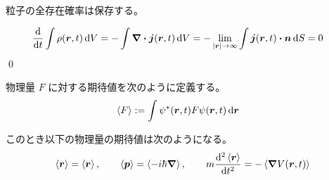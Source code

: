 \documentclass[uplatex,dvipdfmx,a4paper,11pt]{jlreq}
\makeatletter
\newcommand{\rr}{\bm{r}}
\newcommand{\pp}{\bm{p}}
\theoremstyle{definition}
\renewenvironment{proof}[1][\proofname]{\par
  \normalfont
  \topsep6\p@\@plus6\p@ \trivlist
  \item[\hskip\labelsep{\bfseries #1}\@addpunct{\bfseries}]\ignorespaces\quad\par
}{%
  \qed\endtrivlist\@endpefalse
}
\renewcommand\proofname{証明}
\makeatother
\begin{document}
\begin{theorem}
  粒子の全存在確率は保存する。
\end{theorem}
\begin{proof}
  \begin{align}
    \dv{t}\int\rho(\rr, t)\dd{V} & = -\int\vnabla\vdot\bm{j}(\rr, t)\dd{V} = -\lim_{|\rr|\to\infty}\int\bm{j}(\rr, t)\vdot\bm{n}\dd{S} = 0
  \end{align}
\end{proof}
\begin{definition}
  物理量 $F$ に対する期待値を次のように定義する。
  \begin{align}
    \ev{F} & := \int\psi^*(\rr, t)F\psi(\rr, t)\dd{\rr}
  \end{align}
\end{definition}
\begin{theorem}
  このとき以下の物理量の期待値は次のようになる。
  \begin{align}
    \ev{\rr} = \ev{\rr}, \qquad \ev{\pp} = \ev{-i\hbar\vnabla}, \qquad m\dv[2]{\ev{\rr}}{t} = - \ev{\vnabla V(\rr, t)}
  \end{align}
\end{theorem}
\end{document}
